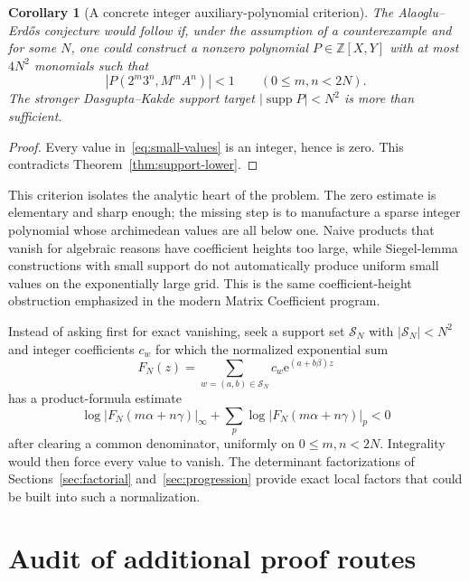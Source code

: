 \documentclass[11pt]{article}
\newcommand{\Z}{\mathbb Z}
\newcommand{\supp}{\operatorname{supp}}
\newcommand{\e}{\mathrm e}
\newcommand{\1}{\mathbf 1}
\theoremstyle{plain}
\newtheorem{corollary}[theorem]{Corollary}
\theoremstyle{definition}
\theoremstyle{remark}
\begin{document}
\begin{corollary}[A concrete integer auxiliary-polynomial criterion]
\label{cor:small-value-criterion}
The Alaoglu--Erd\H{o}s conjecture would follow if, under the assumption of a
counterexample and for some $N$, one could construct a nonzero polynomial
$P\in\Z[X,Y]$ with at most $4N^2$ monomials such that
\begin{equation}\label{eq:small-values}
 |P(2^m3^n,M^mA^n)|<1
 \qquad(0\le m,n<2N).
\end{equation}
The stronger Dasgupta--Kakde support target $|\supp P|<N^2$ is more than
sufficient.
\end{corollary}

\begin{proof}
Every value in~\eqref{eq:small-values} is an integer, hence is zero.  This
contradicts Theorem~\ref{thm:support-lower}.
\end{proof}

This criterion isolates the analytic heart of the problem.  The zero estimate
is elementary and sharp enough; the missing step is to manufacture a sparse
integer polynomial whose archimedean values are all below one.  Naive products
that vanish for algebraic reasons have coefficient heights too large, while
Siegel-lemma constructions with small support do not automatically produce
uniform small values on the exponentially large grid.  This is the same
coefficient-height obstruction emphasized in the modern Matrix Coefficient
program.

\begin{researchbox}
Instead of asking first for exact vanishing, seek a support set
$\mathcal S_N$ with $|\mathcal S_N|<N^2$ and integer coefficients $c_w$ for
which the normalized exponential sum
\[
 F_N(z)=\sum_{w=(a,b)\in\mathcal S_N}c_w\e^{(a+b\beta)z}
\]
has a product-formula estimate
\[
 \log|F_N(m\alpha+n\gamma)|_\infty
 +\sum_p\log|F_N(m\alpha+n\gamma)|_p<0
\]
after clearing a common denominator, uniformly on $0\le m,n<2N$.
Integrality would then force every value to vanish.  The determinant
factorizations of Sections~\ref{sec:factorial} and~\ref{sec:progression}
provide exact local factors that could be built into such a normalization.
\end{researchbox}

\section{Audit of additional proof routes}
\label{sec:audit}
\end{document}
